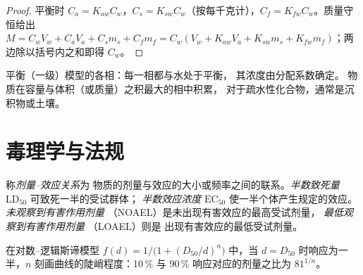 \begin{proof}
平衡时 $C_a = K_{aw}C_w$，$C_s = K_{sw}C_w$（按每千克计），$C_f = K_{fw}C_w$。质量守恒给出
$M = C_wV_w + C_aV_a + C_sm_s + C_fm_f = C_w(V_w + K_{aw}V_a + K_{sw}m_s + K_{fw}m_f)$；两边除以括号内之和即得 $C_w$。
\end{proof}

\begin{omfigure}

{\small 平衡（一级）模型的各相：每一相都与水处于平衡，
其浓度由分配系数确定。
物质在容量与体积（或质量）之积最大的相中积累，
对于疏水性化合物，通常是沉积物或土壤。}
\end{omfigure}

\section{毒理学与法规}

\begin{definition}[剂量–效应]\label{def:b3:environmental-toxicology:dose}
称\emph{剂量–效应关系}为
物质的剂量与效应的大小或频率之间的联系。\emph{半数致死量}
$\mathrm{LD_{50}}$ 可致死一半的受试群体；
\emph{半数效应浓度} $\mathrm{EC_{50}}$ 使一半个体产生规定的效应。
\emph{未观察到有害作用剂量}
（NOAEL）是未出现有害效应的最高受试剂量，
\emph{最低观察到有害作用剂量}
（LOAEL）则是
出现有害效应的最低受试剂量。
\end{definition}

\begin{proposition}[对数–逻辑斯谛模型]\label{prop:b3:environmental-toxicology:dose-response}
在对数–逻辑斯谛模型 $f(d) = 1/\bigl(1 + (D_{50}/d)^n\bigr)$ 中，当 $d = D_{50}$ 时响应为一半，$n$
刻画曲线的陡峭程度：10\,\% 与 90\,\% 响应对应的剂量之比为 $81^{1/n}$。
\end{proposition}

